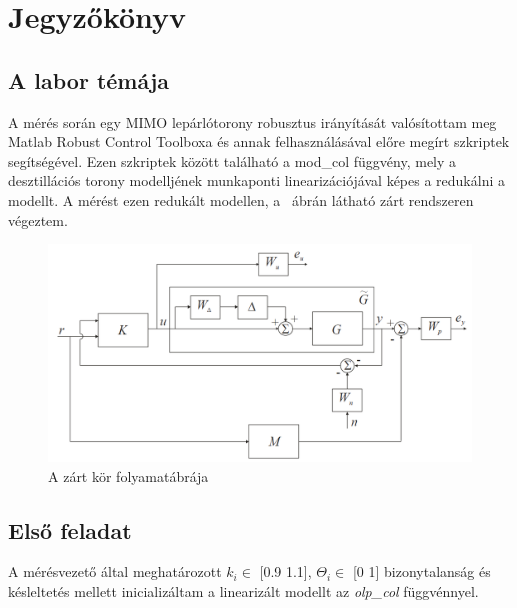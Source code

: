 \chapter{Jegyzőkönyv}
\section{A labor témája}
A mérés során egy MIMO lepárlótorony robusztus irányítását valósítottam meg Matlab Robust Control Toolboxa és annak felhasználásával előre megírt szkriptek segítségével. Ezen szkriptek között található a mod\_col függvény, mely a desztillációs torony modelljének munkaponti linearizációjával képes a redukálni a modellt. A mérést ezen redukált modellen, a ~ábrán látható zárt rendszeren végeztem.

\begin{figure}[!ht]\hspace{1mm}
	\includegraphics[width=140mm,keepaspectratio]{figures/2m06/system.png}
	\caption{A zárt kör folyamatábrája}
	\label{fig:System}
\end{figure}
\newpage
\section{Első feladat}
A mérésvezető által meghatározott {$k_i \in$ [0.9 1.1], $\Theta_i \in$ [0 1]} bizonytalanság és késleltetés mellett inicializáltam a linearizált modellt az \textit{olp\_col} függvénnyel. 

